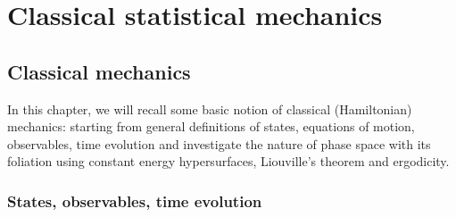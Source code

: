 \part{Classical statistical mechanics}

\chapter{Classical mechanics}

    In this chapter, we will recall some basic notion of classical (Hamiltonian) mechanics: starting from general definitions of states, equations of motion, observables, time evolution and investigate the nature of phase space with its foliation using constant energy hypersurfaces, Liouville's theorem and ergodicity.

\section{States, observables, time evolution}
    
